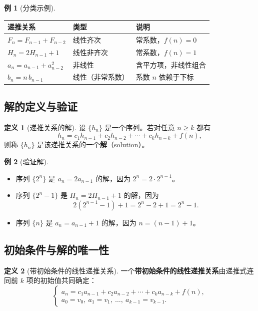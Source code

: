 \documentclass[UTF8,11pt,a4paper]{ctexbook}   %
\theoremstyle{definition}
\newtheorem{definition}{定义}[section]
\newtheorem{example}{例}[section]
\begin{document}
\begin{example}[分类示例]
\begin{table}[htbp]
\centering
\begin{tabular}{|l|l|l|}
\hline
\textbf{递推关系} & \textbf{类型} & \textbf{说明} \\
\hline
$F_n = F_{n-1} + F_{n-2}$ & 线性齐次 & 常系数，$f(n)=0$ \\
\hline
$H_n = 2H_{n-1} + 1$ & 线性非齐次 & 常系数，$f(n)=1$ \\
\hline
$a_n = a_{n-1} + a_{n-2}^2$ & 非线性 & 含平方项，非线性组合 \\
\hline
$b_n = n\,b_{n-1}$ & 线性（非常系数） & 系数 $n$ 依赖于下标 \\
\hline
\end{tabular}
\end{table}
\end{example}

\subsection{解的定义与验证}

\begin{definition}[递推关系的解]
设 $\{h_n\}$ 是一个序列。若对任意 $n \ge k$ 都有
\[
h_n = c_1 h_{n-1} + c_2 h_{n-2} + \cdots + c_k h_{n-k} + f(n),
\]
则称 $\{h_n\}$ 是该递推关系的一个\textbf{解}（solution）。
\end{definition}

\begin{example}[验证解]
\begin{itemize}
    \item 序列 $\{2^n\}$ 是 $a_n = 2a_{n-1}$ 的解，因为 $2^n = 2 \cdot 2^{n-1}$。
    \item 序列 $\{2^n - 1\}$ 是 $H_n = 2H_{n-1} + 1$ 的解，因为
    \[
    2(2^{n-1}-1)+1 = 2^n - 2 + 1 = 2^n - 1.
    \]
    \item 序列 $\{n\}$ 是 $a_n = a_{n-1} + 1$ 的解，因为 $n = (n-1) + 1$。
\end{itemize}
\end{example}

\subsection{初始条件与解的唯一性}

\begin{definition}[带初始条件的线性递推关系]
一个\textbf{带初始条件的线性递推关系}由递推式连同前 $k$ 项的初始值共同确定：
\[
\begin{cases}
a_n = c_1 a_{n-1} + c_2 a_{n-2} + \cdots + c_k a_{n-k} + f(n), \\[0.3em]
a_0 = v_0,\ a_1 = v_1,\ \dots,\ a_{k-1} = v_{k-1}.
\end{cases}
\]
\end{definition}
\end{document}
